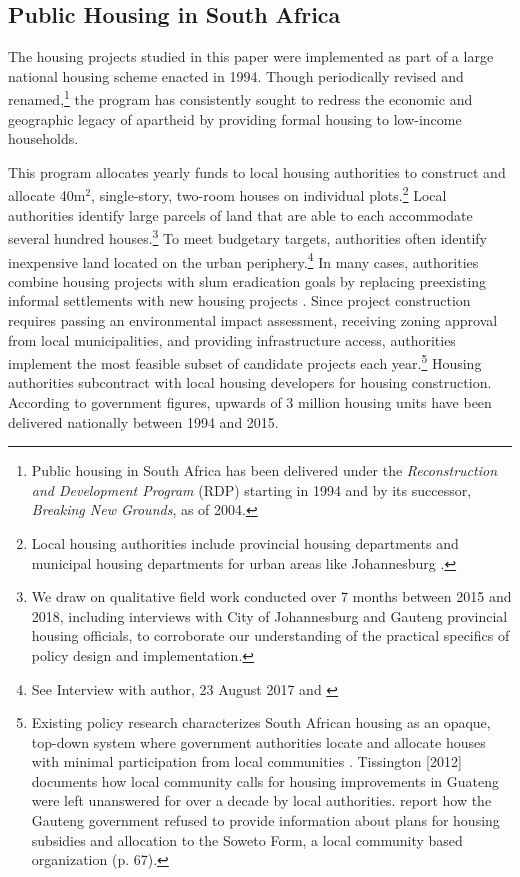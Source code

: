 \documentclass[12pt]{article}
\begin{document}
\subsection{Public Housing in South Africa}


The housing projects studied in this paper were implemented as part of a large national housing scheme enacted in 1994. Though periodically revised and renamed,\footnote{Public housing in South Africa has been delivered under the {\it Reconstruction and Development Program} (RDP) starting in 1994 and  by its successor, {\it Breaking New Grounds}, as of 2004.} the program has consistently sought to redress the economic and geographic legacy of apartheid by providing formal housing to low-income households.  

This program allocates yearly funds to local housing authorities to construct and allocate 40m$^2$, single-story, two-room houses on individual plots.\footnote{Local housing authorities include provincial housing departments and municipal housing departments for urban areas like Johannesburg \citep{dhsreports}.}  Local authorities identify large parcels of land that are able to each accommodate several hundred houses.\footnote{We draw on qualitative field work conducted over 7 months between 2015 and 2018, including interviews with City of Johannesburg and Gauteng provincial housing officials, to corroborate our understanding of the practical specifics of policy design and implementation.}  To meet budgetary targets, authorities often identify inexpensive land located on the urban periphery.\footnote{See Interview with author, 23 August 2017 and \cite{dhsreports}}  In many cases, authorities combine housing projects with slum eradication goals by replacing preexisting informal settlements with new housing projects \citep{hofmeyr2008risk}.  Since project construction requires passing an environmental impact assessment, receiving zoning approval from local municipalities, and providing infrastructure access, authorities implement the most feasible subset of candidate projects each year.\footnote{Existing policy research characterizes South African housing as an opaque, top-down system where government authorities locate and allocate houses with minimal participation from local communities \citep{seriq}.  Tissington [2012] documents how local community calls for housing improvements in Guateng were left unanswered for over a decade by local authorities.  \cite{seriq} report how the Gauteng government refused to provide information about plans for housing subsidies and allocation to the Soweto Form, a local community based organization (p. 67).}   Housing authorities subcontract with local housing developers for housing construction.  According to government figures, upwards of 3 million housing units have been delivered nationally between 1994 and 2015.
\end{document}
